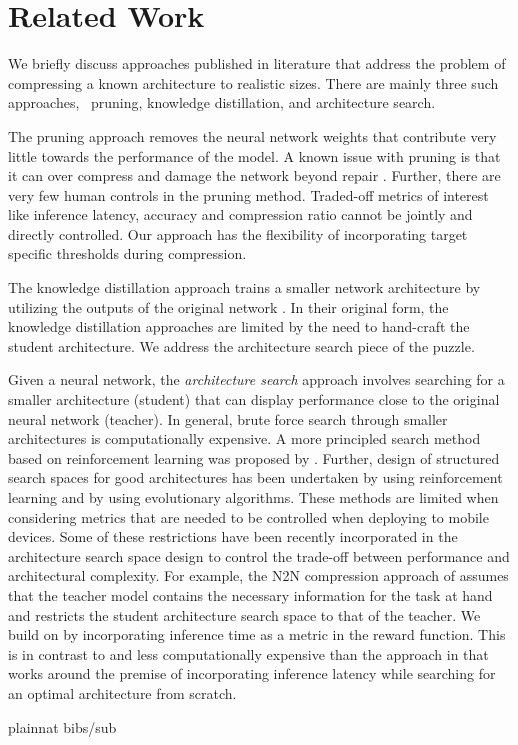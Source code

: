 \documentclass[../main]{subfiles}
\begin{document}
\section{Related Work}
We briefly discuss approaches published in literature that address the problem of compressing a known architecture to realistic sizes.
There are mainly three such approaches, \viz~pruning, knowledge distillation, and architecture search.

The pruning approach \citep{lecun1990optimal,srinivas2015data,guo2016dynamic,anwar2017structured} removes the neural network weights that contribute very little towards the performance of the model.
A known issue with pruning is that it can over compress and damage the network beyond repair \citep{molchanov2016pruning}.
Further, there are very few human controls in the pruning method.
Traded-off metrics of interest like inference latency, accuracy and compression ratio cannot be jointly and directly controlled.
Our approach has the flexibility of incorporating target specific thresholds during compression.

The knowledge distillation approach trains a smaller network architecture by utilizing the outputs of the original network \citep{hinton2015distilling,romero2014fitnets,ba2014deep}.
In their original form, the knowledge distillation approaches are limited by the need to hand-craft the student architecture.
We address the architecture search piece of the puzzle.

Given a neural network, the \emph{architecture search} approach involves searching for a smaller architecture (student) that can display performance close to the original neural network (teacher).
In general, brute force search through smaller architectures is computationally expensive.
A more principled search method based on reinforcement learning was proposed by \citet{zoph2016neural,baker2016designing}.
Further, design of structured search spaces for good architectures has been undertaken by \citet{zoph2017learning} using reinforcement learning and by \citet{real2018regularized,real2017large} using evolutionary algorithms.
These methods are limited when considering metrics that are needed to be controlled when deploying to mobile devices.
Some of these restrictions have been recently incorporated in the architecture search space design \citep{tan2018mnasnet,elsken2018multi,cheng2018searching,ashok2017n2n} to control the trade-off between performance and architectural complexity.
For example, the N2N compression approach of \citet{ashok2017n2n} assumes that the teacher model contains the necessary information for the task at hand and restricts the student architecture search space to that of the teacher.
We build on \citet{ashok2017n2n} by incorporating inference time as a metric in the reward function.
This is in contrast to and less computationally expensive than the approach in \citet{tan2018mnasnet} that works around the premise of incorporating inference latency while searching for an optimal architecture from scratch.


\bibsubfile
{plainnat}
{bibs/sub}
\end{document}
